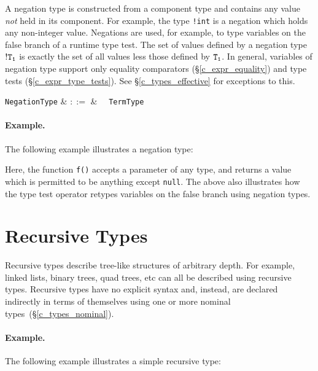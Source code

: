 A negation type is constructed from a component type and contains any value {\em not} held in its component.  For example, the type \lstinline{!int} is a negation which holds any non-integer value.  Negations are used, for example, to type variables on the false branch of a runtime type test.  The set of values defined by a negation type ${\tt !T_1}$ is exactly the set of all values less those defined by ${\tt T_1}$.  In general, variables of negation type support only equality comparators (\S\ref{c_expr_equality}) and type tests (\S\ref{c_expr_type_tests}).  See \S\ref{c_types_effective} for exceptions to this.

\begin{syntax}
  \verb+NegationType+ & $::=$ & \token{!}\ \ \verb+TermType+\\
\end{syntax}

\paragraph{Example.} The following example illustrates a negation type:



Here, the function \lstinline{f()} accepts a parameter of any type, and returns a value which is permitted to be anything except \lstinline{null}.  The above also illustrates how the type test operator retypes variables on the false branch using negation types.

\section{Recursive Types}
\label{c_types_recursive}

Recursive types describe tree-like structures of arbitrary depth.  For example, linked lists, binary trees, quad trees, etc can all be described using recursive types.  Recursive types have no explicit syntax and, instead, are declared indirectly in terms of themselves using one or more nominal types~(\S\ref{c_types_nominal}).\\

\paragraph{Example.} The following example illustrates a simple recursive type:



